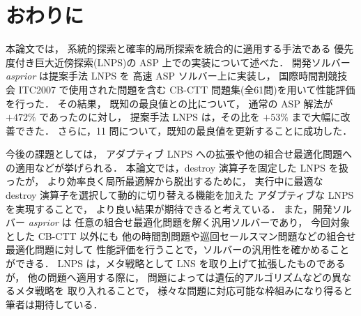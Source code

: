 \chapter{おわりに}

本論文では，
系統的探索と確率的局所探索を統合的に適用する手法である
優先度付き巨大近傍探索(LNPS)の ASP 上での実装について述べた．
開発ソルバー \textit{asprior} は提案手法 LNPS を
高速 ASP ソルバー{\clingo}上に実装し，
国際時間割競技会 ITC2007 で使用された問題を含む
 CB-CTT 問題集(全61問)を用いて性能評価を行った．
その結果，
既知の最良値との比について，
通常の ASP 解法が $+472\%$ であったのに対し，
提案手法 LNPS は，その比を $+53\%$ まで大幅に改善できた．
さらに，11 問について，既知の最良値を更新することに成功した．

今後の課題としては，
アダプティブ LNPS への拡張や他の組合せ最適化問題への適用などが挙げられる．
本論文では，destroy 演算子を固定した LNPS を扱ったが，
より効率良く局所最適解から脱出するために，
実行中に最適な destroy 演算子を選択して動的に切り替える機能を加えた
アダプティブな LNPS を実現することで，
より良い結果が期待できると考えている．
また，開発ソルバー \textit{asprior} は
任意の組合せ最適化問題を解く汎用ソルバーであり，
今回対象とした CB-CTT 以外にも
他の時間割問題や巡回セールスマン問題などの組合せ最適化問題に対して
性能評価を行うことで，ソルバーの汎用性を確かめることができる．
LNPS は，メタ戦略として LNS を取り上げて拡張したものであるが，
他の問題へ適用する際に，
問題によっては遺伝的アルゴリズムなどの異なるメタ戦略を
取り入れることで，
様々な問題に対応可能な枠組みになり得ると筆者は期待している．

